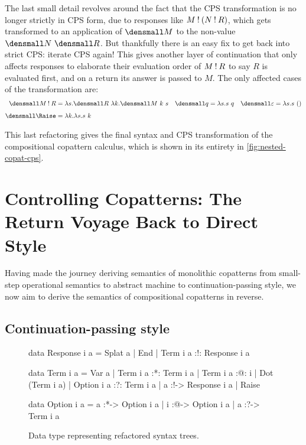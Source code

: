 \documentclass[sigplan,screen]{acmart}
\begin{document}
The last small detail revolves around the fact that the CPS transformation is no
longer strictly in CPS form, due to responses like $M \mathbin{!} (N \mathbin{!} R)$, which
gets transformed to an application of $\den{M}$ to the non-value
$\den{N}~\den{R}$.  But thankfully there is an easy fix to get back into strict
CPS: iterate CPS again!  This gives another layer of continuation that only
affects responses to elaborate their evaluation order of $M \mathbin{!} R$ to say $R$
is evaluated first, and on a return its answer is passed to $M$.  The only
affected cases of the transformation are:
\begin{align*}
  \den{M \ans R}
  &=
  \lambda s. \den{R} ~ \lambda k. \den{M} ~ k ~ s
  &
  \den{q}
  &=
  \lambda s. s ~ q
  &
  \den{\varepsilon}
  &=
  \lambda s. s ~ ()
  \\[1ex]
  \den{\Raise}
  &=
  \lambda k. \lambda s. s ~ k
\end{align*}

This last refactoring gives the final syntax and CPS transformation of the
compositional copattern calculus, which is shown in its entirety in
\cref{fig:nested-copat-cps}.

\section{Controlling Copatterns: The Return Voyage Back to Direct Style}
\label{sec:control-copat}

Having made the journey deriving semantics of monolithic copatterns from
small-step operational semantics to abstract machine to continuation-passing
style, we now aim to derive the semantics of compositional copatterns in reverse.


\subsection{Continuation-passing style}

\begin{figure}
\centering
\begin{haskell}
data Response i a
  = Splat a
  | End
  | Term i a :!: Response i a

data Term i a
  = Var a
  | Term i a :*: Term i a
  | Term i a :@: i
  | Dot (Term i a)
  | Option i a :?: Term i a
  | a :!-> Response i a
  | Raise

data Option i a
  = a :*-> Option i a
  | i :@-> Option i a
  | a :?-> Term i a
\end{haskell}
\caption{Data type representing refactored syntax trees.}
\label{fig:nest-syntax-code}
\end{figure}
\end{document}
